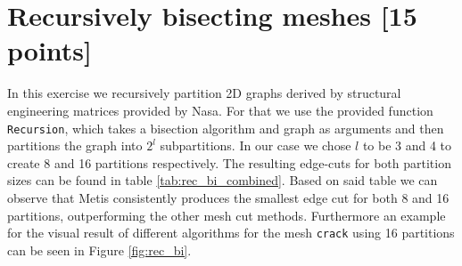 \section{Recursively bisecting meshes [15 points]}
In this exercise we recursively partition 2D graphs derived by structural engineering matrices provided by Nasa. For that we use the provided function \texttt{Recursion}, which takes a bisection algorithm and graph as arguments and then partitions the graph into $2^l$ subpartitions. In our case we chose $l$ to be 3 and 4 to create 8 and 16 partitions respectively. The resulting edge-cuts for both partition sizes can be found in table \ref{tab:rec_bi_combined}.
Based on said table we can observe that Metis consistently produces the smallest edge cut for both 8 and 16 partitions, outperforming the other mesh cut methods. 
Furthermore an example for the visual result of different algorithms for the mesh \texttt{crack} using 16 partitions can be seen in Figure \ref{fig:rec_bi}.
\begin{table}[H]
	\centering
	\caption{Edge cut results for recursive bi-partitioning using 8 and 16 partitions.}
	\label{tab:rec_bi_combined}
\end{table}



